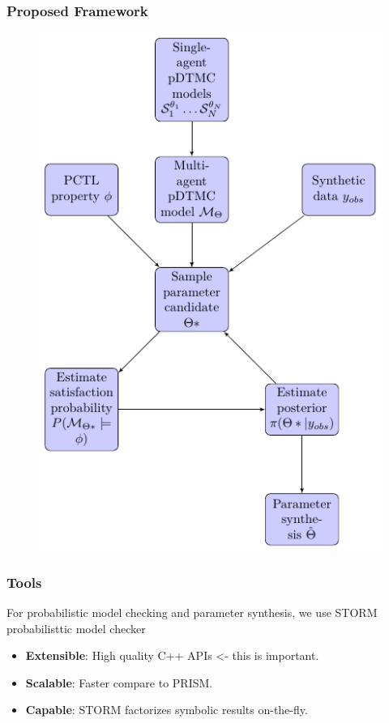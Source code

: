 \documentclass{beamer}
\begin{document}
\begin{frame}
  \frametitle{Proposed Framework}
  \begin{figure}[t]
    \includegraphics[height=\textheight]{framework.png} \centering
  \end{figure}
\end{frame}

\begin{frame}
  \frametitle{Tools}
  For probabilistic model checking and parameter synthesis, we use STORM
  probabilisttic model checker
  \begin{itemize}
  \item \textbf{Extensible}: High quality C++ APIs <- this is important.
  \item \textbf{Scalable}: Faster compare to PRISM.
  \item \textbf{Capable}: STORM factorizes symbolic results on-the-fly.
  \end{itemize}
\end{frame}
\end{document}

